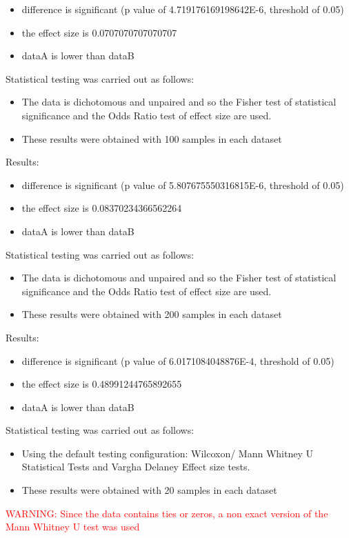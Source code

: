 \documentclass[]{article}
\begin{document}
\begin{itemize}
\item{difference is significant (p value of 4.719176169198642E-6, threshold of 0.05)}
\item{the effect size is 0.0707070707070707}
\item{dataA is lower than dataB}
\end{itemize}Statistical testing was carried out as follows: \begin{itemize}
\item{The data is dichotomous and unpaired and so the Fisher test of statistical significance and the Odds Ratio test of effect size are used.}
\item{These results were obtained with 100 samples in each dataset}
\end{itemize}Results:
\begin{itemize}
\item{difference is significant (p value of 5.807675550316815E-6, threshold of 0.05)}
\item{the effect size is 0.08370234366562264}
\item{dataA is lower than dataB}
\end{itemize}Statistical testing was carried out as follows: \begin{itemize}
\item{The data is dichotomous and unpaired and so the Fisher test of statistical significance and the Odds Ratio test of effect size are used.}
\item{These results were obtained with 200 samples in each dataset}
\end{itemize}Results:
\begin{itemize}
\item{difference is significant (p value of 6.0171084048876E-4, threshold of 0.05)}
\item{the effect size is 0.48991244765892655}
\item{dataA is lower than dataB}
\end{itemize}Statistical testing was carried out as follows: \begin{itemize}
\item{Using the default testing configuration: Wilcoxon/ Mann Whitney U Statistical Tests and Vargha Delaney Effect size tests.}
\item{These results were obtained with 20 samples in each dataset}
\end{itemize}
\textcolor{Red}{WARNING: Since the data contains ties or zeros, a non exact version of the Mann Whitney U test was used
}
\end{document}
